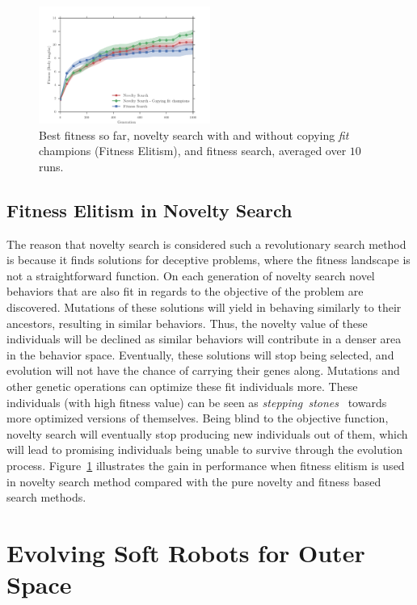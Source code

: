 \documentclass{sig-alternate}
\begin{document}
\begin{figure}[t!]
\centering
\includegraphics[width=0.5\textwidth]{../Figures/Results/CopyFitChampions10.pdf}
\caption{Best fitness so far, novelty search with and without copying \emph{fit} champions (Fitness Elitism), and fitness search, averaged over $10$ runs.}
\label{fig:CopyFitChampions10}
\vspace{-15pt}
\end{figure}


\subsection{Fitness Elitism in Novelty Search}

The reason that novelty search is considered such a revolutionary search method is because it finds solutions for deceptive problems, where the fitness landscape is not a straightforward function. On each generation of novelty search novel behaviors that are also fit in regards to the objective of the problem are discovered. Mutations of these solutions will yield in behaving similarly to their ancestors, resulting in similar behaviors. Thus, the novelty value of these individuals will be declined as similar behaviors will contribute in a denser area in the behavior space. Eventually, these solutions will stop being selected, and evolution will not have the chance of carrying their genes along. Mutations and other genetic operations can optimize these fit individuals more. These individuals (with high fitness value) can be seen as \emph{stepping~stones}~\cite{lehman2011abandoning} towards more optimized versions of themselves. Being blind to the objective function, novelty search will eventually stop producing new individuals out of them, which will lead to promising individuals being unable to survive through the evolution process. Figure~\ref{fig:CopyFitChampions10} illustrates the gain in performance when fitness elitism is used in novelty search method compared with the pure novelty and fitness based search methods.


\section{Evolving Soft Robots for Outer Space} 
\end{document}
